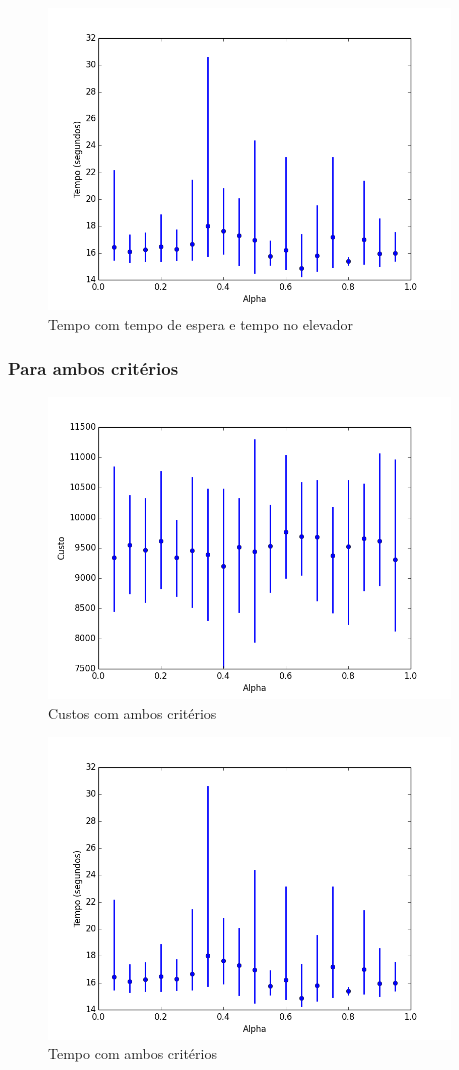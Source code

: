 		\begin{figure}[H]
			\centering
			\includegraphics[height=8cm]{images/time_both_alpha} %
			\caption{Tempo com tempo de espera e tempo no elevador}
			\label{fig:timewaitingiterations}
		\end{figure}
	
	\subsubsection{Para ambos critérios} %
		\begin{figure}[H]
			\centering
			\includegraphics[height=8cm]{images/cost_both_alpha} %
			\caption{Custos com ambos critérios}
			\label{fig:costbothiterations}
		\end{figure}
		
		\begin{figure}[H]
			\centering
			\includegraphics[height=8cm]{images/time_both_alpha} %
			\caption{Tempo com ambos critérios}
			\label{fig:timebothiterations}
		\end{figure}